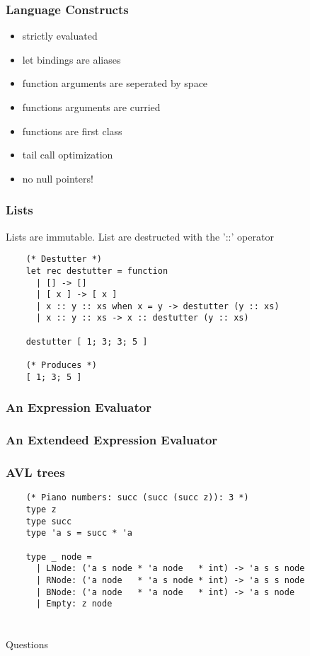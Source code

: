 \documentclass[mathserif,xcolor=svgnames]{beamer}
\renewcommand{\_}{\mathunderscore}
\begin{document}
\begin{frame}[fragile]
  \frametitle{Language Constructs}
  \begin{itemize}
    \item strictly evaluated
    \item let bindings are aliases
    \item function arguments are seperated by space
    \item functions arguments are curried
    \item functions are first class
    \item tail call optimization
    \item no null pointers!
  \end{itemize}
\end{frame}

\begin{frame}[fragile]
  \frametitle{Lists}
  Lists are immutable.
  List are destructed with the '::' operator
  \begin{lstlisting}
    (* Destutter *)
    let rec destutter = function
      | [] -> []
      | [ x ] -> [ x ]
      | x :: y :: xs when x = y -> destutter (y :: xs)
      | x :: y :: xs -> x :: destutter (y :: xs)

    destutter [ 1; 3; 3; 5 ]

    (* Produces *)
    [ 1; 3; 5 ]
  \end{lstlisting}

\end{frame}


\begin{frame}[fragile]
  \frametitle{An Expression Evaluator}
  
\end{frame}

\begin{frame}[fragile]
  \frametitle{An Extendeed Expression Evaluator}
  
\end{frame}


\begin{frame}[fragile]
  \frametitle{AVL trees}
  \begin{lstlisting}
    (* Piano numbers: succ (succ (succ z)): 3 *)
    type z
    type succ
    type 'a s = succ * 'a

    type _ node =
      | LNode: ('a s node * 'a node   * int) -> 'a s s node
      | RNode: ('a node   * 'a s node * int) -> 'a s s node
      | BNode: ('a node   * 'a node   * int) -> 'a s node
      | Empty: z node
  \end{lstlisting}

\end{frame}

\section{}
\begin{frame}
  \center \LARGE Questions
\end{frame}
\end{document}
